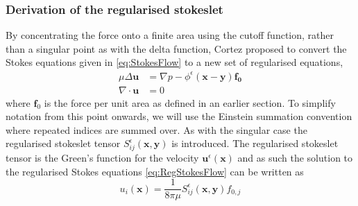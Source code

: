 \subsubsection{Derivation of the regularised stokeslet}
 By concentrating the force onto a finite area using the cutoff function, rather than a singular point as with the delta function, Cortez proposed to convert the Stokes equations given in \cref{eq:StokesFlow} to a new set of regularised equations,
\begin{subequations}
\label{eq:RegStokesFlow}
\begin{align}
    \mu\Delta\boldsymbol{u} &= \nabla p - \phi^{\epsilon}(\bm{x}-\bm{y})\bm{f_0} \label{eq:RegStokesFlow1} \\
    \nabla \cdot \boldsymbol{u} &= 0 \label{eq:RegStokesFlow2}
\end{align}
\end{subequations}
where $\bm{f}_0$ is the force per unit area as defined in an earlier section.
To simplify notation from this point onwards, we will use the Einstein summation convention where repeated indices are summed over. As with the singular case the regularised stokeslet tensor $S^\epsilon_{ij}(\bm{x},\bm{y})$ is introduced. The regularised stokeslet tensor is the Green's function for the velocity $\mathbf{u}^\epsilon(\bm{x})$ and as such the solution to the regularised Stokes equations \cref{eq:RegStokesFlow} can be written as
\begin{equation}
\label{eq:regvelsol}
    u_i(\bm{x}) = \frac{1}{8\pi\mu}S^\epsilon_{ij}(\bm{x},\bm{y})f_{0,j}
\end{equation}

